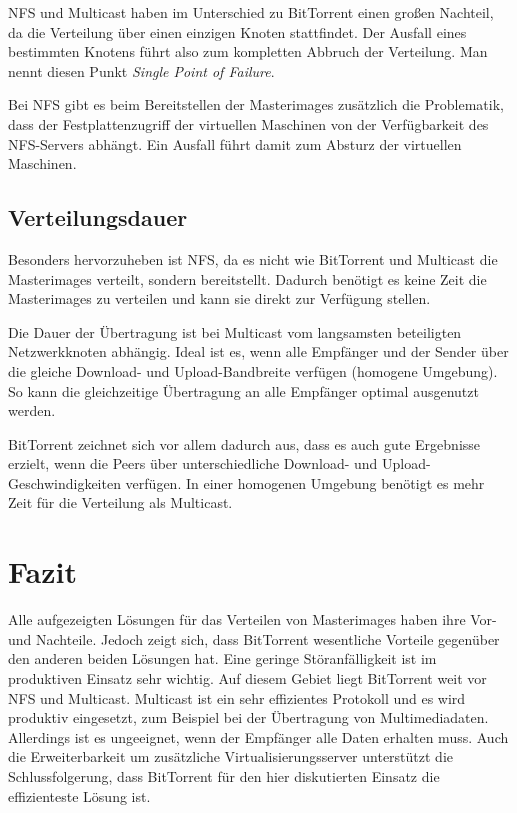 NFS und Multicast haben im Unterschied zu BitTorrent einen großen Nachteil, da die Verteilung über einen einzigen Knoten stattfindet. Der Ausfall eines bestimmten Knotens führt also zum kompletten Abbruch der Verteilung. Man nennt diesen Punkt \textit{Single Point of Failure}. 

Bei NFS gibt es beim Bereitstellen der Masterimages zusätzlich die Problematik, dass der Festplattenzugriff der virtuellen Maschinen von der Verfügbarkeit des NFS-Servers abhängt. Ein Ausfall führt damit zum Absturz der virtuellen Maschinen.


\subsection{Verteilungsdauer}
Besonders hervorzuheben ist NFS, da es nicht wie BitTorrent und Multicast die Masterimages verteilt, sondern bereitstellt. Dadurch benötigt es keine Zeit die Masterimages zu verteilen und kann sie direkt zur Verfügung stellen. 

Die Dauer der Übertragung ist bei Multicast vom langsamsten beteiligten Netzwerkknoten abhängig. Ideal ist es, wenn alle Empfänger und der Sender über die gleiche Download- und Upload-Bandbreite verfügen (homogene Umgebung). So kann die gleichzeitige Übertragung an alle Empfänger optimal ausgenutzt werden.

BitTorrent zeichnet sich vor allem dadurch aus, dass es auch gute Ergebnisse erzielt, wenn die Peers über unterschiedliche Download- und Upload-Geschwindigkeiten verfügen. In einer homogenen Umgebung benötigt es mehr Zeit für die Verteilung als Multicast. 

\section{Fazit}

Alle aufgezeigten Lösungen für das Verteilen von Masterimages haben ihre Vor- und Nachteile. Jedoch zeigt sich, dass BitTorrent wesentliche Vorteile gegenüber den anderen beiden Lösungen hat. Eine geringe Störanfälligkeit ist im produktiven Einsatz sehr wichtig. Auf diesem Gebiet liegt BitTorrent weit vor NFS und Multicast. Multicast ist ein sehr effizientes Protokoll und es wird produktiv eingesetzt, zum Beispiel bei der Übertragung von Multimediadaten. Allerdings ist es ungeeignet, wenn der Empfänger alle Daten erhalten muss. Auch die Erweiterbarkeit um zusätzliche Virtualisierungsserver unterstützt die Schlussfolgerung, dass BitTorrent für den hier diskutierten Einsatz die effizienteste Lösung ist.